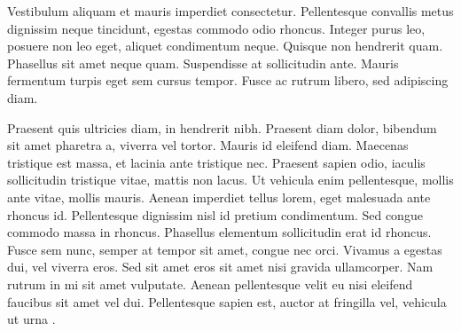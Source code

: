 Vestibulum aliquam et mauris imperdiet consectetur. Pellentesque convallis
metus dignissim neque tincidunt, egestas commodo odio rhoncus. Integer
purus leo, posuere non leo eget, aliquet condimentum neque. Quisque
non hendrerit quam. Phasellus sit amet neque quam. Suspendisse at
sollicitudin ante. Mauris fermentum turpis eget sem cursus tempor.
Fusce ac rutrum libero, sed adipiscing diam.

Praesent quis ultricies diam, in hendrerit nibh. Praesent diam dolor,
bibendum sit amet pharetra a, viverra vel tortor. Mauris id eleifend
diam. Maecenas tristique est massa, et lacinia ante tristique nec.
Praesent sapien odio, iaculis sollicitudin tristique vitae, mattis
non lacus. Ut vehicula enim pellentesque, mollis ante vitae, mollis
mauris. Aenean imperdiet tellus lorem, eget malesuada ante rhoncus
id. Pellentesque dignissim nisl id pretium condimentum. Sed congue
commodo massa in rhoncus. Phasellus elementum sollicitudin erat id
rhoncus. Fusce sem nunc, semper at tempor sit amet, congue nec orci.
Vivamus a egestas dui, vel viverra eros. Sed sit amet eros sit amet
nisi gravida ullamcorper. Nam rutrum in mi sit amet vulputate. Aenean
pellentesque velit eu nisi eleifend faucibus sit amet vel dui. Pellentesque
sapien est, auctor at fringilla vel, vehicula ut urna \cite{Dijkstra68Letters}.